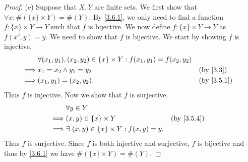 \begin{proof}{(e)}
  Suppose that \(X, Y\) are finite sets.
  We first show that \(\forall x : \#(\{x\} \times Y) = \#(Y)\).
  By \cref{3.6.1}, we only need to find a function \(f : \{x\} \times Y \to Y\) such that \(f\) is bijective.
  We now define \(f : \{x\} \times Y \to Y\) as \(f(x', y) = y\).
  We need to show that \(f\) is bijective.
  We start by showing \(f\) is injective.
  \begin{align*}
             & \forall (x_1, y_1), (x_2, y_2) \in \{x\} \times Y : f(x_1, y_1) = f(x_2, y_2)                             \\
    \implies & x_1 = x_2 \land y_1 = y_2                                                     &  & \text{(by \cref{3.3})} \\
    \implies & (x_1, y_1) = (x_2, y_2).                                                      &  & \by{3.5.1}
  \end{align*}
  Thus \(f\) is injective.
  Now we show that \(f\) is surjective.
  \begin{align*}
             & \forall y \in Y                                                   \\
    \implies & (x, y) \in \{x\} \times Y                         &  & \by{3.5.4} \\
    \implies & \exists\ (x, y) \in \{x\} \times Y : f(x, y) = y.
  \end{align*}
  Thus \(f\) is surjective.
  Since \(f\) is both injective and surjective, \(f\) is bijective and thus by \cref{3.6.1} we have \(\#(\{x\} \times Y) = \#(Y)\).


\end{proof}

